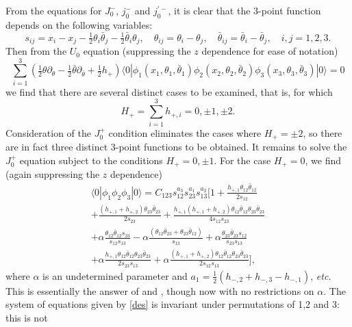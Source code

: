 \documentclass[a4paper,12pt]{article}
\def\thetabar    {\bar{\theta}}
\def\hf          {\tfrac{1}{2}}
\begin{document}
From the equations for $J_0^-$, $j_0^-$ and $j_0^{'-}$, it is clear
that the 3-point function depends on the following variables:
\begin{equation}
s_{ij} = x_i-x_j-\hf \theta_i\thetabar_j -\hf \thetabar_i \theta_j,
\quad \theta_{ij} = \theta_i - \theta_j, \quad \thetabar_{ij} =
\thetabar_i - \thetabar_j, \quad i,j=1,2,3.
\end{equation}
Then from the $U_0$ equation (suppressing the $z$ dependence for ease
of notation)
\begin{equation}
\sum_{i=1}^3 (\hf \theta \partial_{\theta} - \hf \thetabar
\partial_{\thetabar} + \hf h_+) \langle 0 | \phi_1
(x_1,\theta_1,\thetabar_1) \phi_2  (x_2,\theta_2,\thetabar_2) \phi_3
(x_3,\theta_3,\thetabar_3)| 0 \rangle = 0
\end{equation}
we find that there are several distinct cases to be examined, that is,
for which
\begin{equation}
H_+ = \sum_{i=1}^3 h_{+,i} = 0, \pm 1, \pm 2. 
\end{equation}
Consideration of the $J_0^+$ condition eliminates the cases where
$H_+ = \pm 2$, so there are in fact three distinct
3-point functions to be obtained.  It remains to solve the $J_0^+$
equation subject to the conditions $H_+ = 0, \pm 1$.
For the case $H_+ = 0$, we find (again suppressing the $z$ dependence)
\begin{multline}
\label{3pte}
\langle 0 | \phi_1 \phi_2 \phi_3 | 0 \rangle = C_{123}
s_{12}^{a_3} s_{23}^{a_1} s_{13}^{a_2} \bigg[ 1 +
\frac{h_{+,1} \theta_{12}\thetabar_{12}}{2s_{12}}\\
 + \frac{(h_{+,1}+h_{+,2})
\theta_{23}\thetabar_{23}}{2s_{23}} + \frac{h_{+,1}(h_{+,1}+h_{+,2})
\theta_{12}\thetabar_{12}\theta_{23}\thetabar_{23}}{4s_{12}s_{23}}\\
 + \alpha \frac{\theta_{12}\thetabar_{12}s_{23}}{s_{12}s_{13}} - \alpha
\frac{(\theta_{12}\thetabar_{23} + \theta_{23}\thetabar_{12})}{s_{13}}
+ \alpha \frac{\theta_{23}\thetabar_{23}s_{12}}{s_{23}s_{13}}\\
 + \alpha
\frac{h_{+,1}\theta_{12}\thetabar_{12}\theta_{23}\thetabar_{23}}{2s_{23}s_{13}}+
\alpha
\frac{(h_{+,1}+h_{+,2})\theta_{12}\thetabar_{12}\theta_{23}\thetabar_{23}}{2s_{12}s_{13}}\bigg],  
\end{multline}
where $\alpha$ is an undetermined parameter and
$a_1=\hf(h_{-,2}+h_{-,3}-h_{-,1})$, {\em etc.}  This is essentially the
answer of \cite{MSS} and \cite {Bl}, though now with no restrictions
on $\alpha$.  The system of equations given by
\eqref{des} is invariant under permutations of 1,2 and 3: this is not
\end{document}

